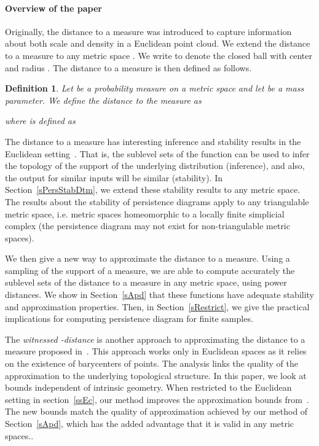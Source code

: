 \documentclass[a4paper]{article}
\newtheorem{definition}[theorem]{Definition}
\begin{document}
\paragraph{Overview of the paper} 

Originally, the distance to a measure was introduced to capture information about both scale and density in a Euclidean point cloud.
We extend the distance to a measure to any metric space .
We write  to denote the closed ball with center  and radius .
The distance to a measure is then defined as follows.
\begin{definition}
Let  be a probability measure on a metric space  and let  be a mass parameter. We define the distance  to the measure  as

where  is defined as

\end{definition}



The distance to a measure has interesting inference and stability results in the Euclidean setting~\cite{gipmCCM}.
That is, the sublevel sets of the function can be used to infer the topology of the support of the underlying distribution (inference), and also, the output for similar inputs will be similar (stability).
In Section~\ref{sPersStabDtm}, we extend these stability results to any metric space.
The results about the stability of persistence diagrams apply to any triangulable metric space, i.e. metric spaces homeomorphic to a locally finite simplicial complex (the persistence diagram may not exist for non-triangulable metric spaces).


We then give a new way to approximate the distance to a measure.
Using a sampling of the support of a measure, we are able to compute accurately the sublevel sets of the distance to a measure in any metric space, using power distances.
We show in Section~\ref{sApd} that these functions have adequate stability and approximation properties.
Then, in Section~\ref{sRestrict}, we give the practical implications for computing persistence diagram for finite samples.

The \emph{witnessed -distance} is another approach to approximating the distance to a measure proposed in~\cite{wkdGMM}.
This approach works only in Euclidean spaces as it relies on the existence of barycenters of points.
The analysis links the quality of the approximation to the underlying topological structure.
In this paper, we look at bounds independent of intrinsic geometry.
When restricted to the Euclidean setting in section~\ref{ssEc}, our method improves the approximation bounds from~\cite{wkdGMM}.
The new bounds match the quality of approximation achieved by our method of Section~\ref{sApd}, which has the added advantage that it is valid in any metric spaces..
\end{document}
